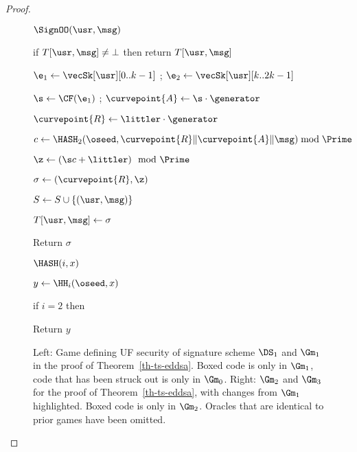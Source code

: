 \begin{proof}
\begin{figure}
{			\begin{oracle}{$\SignOO(\usr, \msg)$}
				\item if $T[\usr, \msg] \neq \bot$ then return $T[\usr, \msg]$
				\item $\e_1 \gets \vecSk[\usr][0..k-1]$ ; $\e_2 \gets \vecSk[\usr][k..2k-1]$ 
				\item $\s \gets \CF(\e_1)$ ; $\curvepoint{A} \gets \s\cdot \generator$
				\item \gamechange{$\littler \getsr \Z_{\Prime}$}
				\item {}
				\item \quad {}
				\item {}
				\item $\curvepoint{R} \gets \littler\cdot \generator$
				\item $c \gets \HASH_2(\oseed, \curvepoint{R}\|\curvepoint{A}\|\msg) \bmod \Prime$
				\item $\z \gets (\s c + \littler) \mod \Prime$
				\item $\sigma \gets (\curvepoint{R},\z)$
				\item $S \gets S \cup \{(\usr, \msg)\}$
				\item $T[\usr, \msg] \gets \sigma$
				\item Return $\sigma$
			\end{oracle}
			\ExptSepSpace
			
			\begin{oracle}{$\HASH(i,x)$}
				\item $y \gets \HH_i(\oseed,x)$
				\item if $i = 2$ then 
				\item \quad {}
				\item \quad \quad {}
				\item \quad {}
				\item Return $y$
			\end{oracle}
	}
	\vspace{-5pt}
	\caption{
		Left: Game defining UF security of signature scheme $\DS_1$ and $\Gm_1$ in the proof of Theorem~\ref{th-ts-eddsa}. Boxed code is only in $\Gm_1$, code that has been struck out is only in $\Gm_0$. Right: $\Gm_2$ and $\Gm_3$ for the proof of Theorem~\ref{th-ts-eddsa}, with changes from $\Gm_1$ highlighted. Boxed code is only in $\Gm_2$. Oracles that are identical to prior games have been omitted.}
		\label{fig:gm-pf-ts-eddsa-0-3}
		\hrulefill
		\vspace{-10pt}
	\end{figure}
	

\end{proof}
